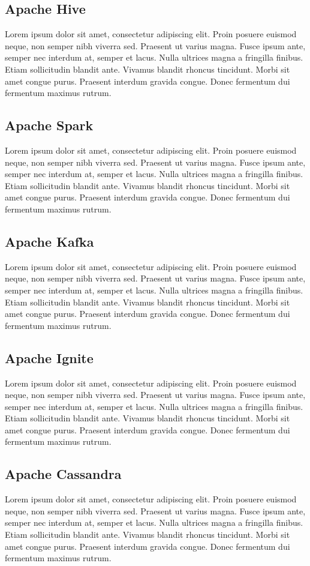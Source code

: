\subsection{Apache Hive} 
\label{app:hive}
Lorem ipsum dolor sit amet, consectetur adipiscing elit. Proin posuere euismod neque, non semper nibh viverra sed. Praesent ut varius magna. Fusce ipsum ante, semper nec interdum at, semper et lacus. Nulla ultrices magna a fringilla finibus. Etiam sollicitudin blandit ante. Vivamus blandit rhoncus tincidunt. Morbi sit amet congue purus. Praesent interdum gravida congue. Donec fermentum dui fermentum maximus rutrum.
\subsection{Apache Spark} 
\label{app:spark}
Lorem ipsum dolor sit amet, consectetur adipiscing elit. Proin posuere euismod neque, non semper nibh viverra sed. Praesent ut varius magna. Fusce ipsum ante, semper nec interdum at, semper et lacus. Nulla ultrices magna a fringilla finibus. Etiam sollicitudin blandit ante. Vivamus blandit rhoncus tincidunt. Morbi sit amet congue purus. Praesent interdum gravida congue. Donec fermentum dui fermentum maximus rutrum.
\subsection{Apache Kafka} 
\label{app:kafka}
Lorem ipsum dolor sit amet, consectetur adipiscing elit. Proin posuere euismod neque, non semper nibh viverra sed. Praesent ut varius magna. Fusce ipsum ante, semper nec interdum at, semper et lacus. Nulla ultrices magna a fringilla finibus. Etiam sollicitudin blandit ante. Vivamus blandit rhoncus tincidunt. Morbi sit amet congue purus. Praesent interdum gravida congue. Donec fermentum dui fermentum maximus rutrum.
\subsection{Apache Ignite} 
\label{app:ignite}
Lorem ipsum dolor sit amet, consectetur adipiscing elit. Proin posuere euismod neque, non semper nibh viverra sed. Praesent ut varius magna. Fusce ipsum ante, semper nec interdum at, semper et lacus. Nulla ultrices magna a fringilla finibus. Etiam sollicitudin blandit ante. Vivamus blandit rhoncus tincidunt. Morbi sit amet congue purus. Praesent interdum gravida congue. Donec fermentum dui fermentum maximus rutrum.
\subsection{Apache Cassandra} 
\label{app:cassandra}
Lorem ipsum dolor sit amet, consectetur adipiscing elit. Proin posuere euismod neque, non semper nibh viverra sed. Praesent ut varius magna. Fusce ipsum ante, semper nec interdum at, semper et lacus. Nulla ultrices magna a fringilla finibus. Etiam sollicitudin blandit ante. Vivamus blandit rhoncus tincidunt. Morbi sit amet congue purus. Praesent interdum gravida congue. Donec fermentum dui fermentum maximus rutrum.
